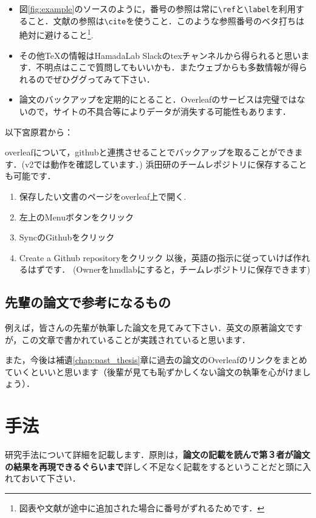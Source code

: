 \documentclass[dvipdfmx,autodetect-engine]{jsreport}
\begin{document}
\begin{itemize}
\item 図\ref{fig:example}のソースのように，番号の参照は常に\texttt{\textbackslash ref}と\texttt{\textbackslash label}を利用すること．文献の参照は\texttt{\textbackslash cite}を使うこと．このような参照番号のベタ打ちは絶対に避けること\footnote{図表や文献が途中に追加された場合に番号がずれるためです．}.
\item その他\TeX の情報はHamadaLab Slackのtexチャンネルから得られると思います．不明点はここで質問してもいいかも．またウェブからも多数情報が得られるのでぜひググってみて下さい．
\item 論文のバックアップを定期的にとること．Overleafのサービスは完璧ではないので，サイトの不具合等によりデータが消失する可能性もあります．
\end{itemize}

以下宮原君から：

overleafについて，githubと連携させることでバックアップを取ることができます．(v2では動作を確認しています．)
浜田研のチームレポジトリに保存することも可能です．
\begin{enumerate}
\item 保存したい文書のページをoverleaf上で開く.
\item 左上のMenuボタンをクリック
\item SyncのGithubをクリック
\item Create a Github repositoryをクリック
以後，英語の指示に従っていけば作れるはずです．
(Ownerをhmdlabにすると，チームレポジトリに保存できます)
\end{enumerate}


\section{先輩の論文で参考になるもの}

例えば，皆さんの先輩が執筆した論文\cite{pmid29315213,pmid29040374}を見てみて下さい．英文の原著論文ですが，この文章で書かれていることが実践されていると思います．

また，今後は補遺\ref{chap:past_thesis}章に過去の論文のOverleafのリンクをまとめていくといいと思います（後輩が見ても恥ずかしくない論文の執筆を心がけましょう）．

\chapter{手法}

研究手法について詳細を記載します．原則は，\textbf{論文の記載を読んで第３者が論文の結果を再現できるぐらいまで}詳しく不足なく記載をするということだと頭に入れておいて下さい．
\end{document}
